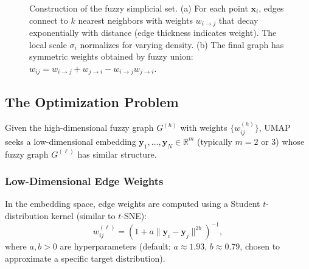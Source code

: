 \begin{figure}[h]
\caption{Construction of the fuzzy simplicial set. (a) For each point $\mathbf{x}_i$, edges connect to $k$ nearest neighbors with weights $w_{i \to j}$ that decay exponentially with distance (edge thickness indicates weight). The local scale $\sigma_i$ normalizes for varying density. (b) The final graph has symmetric weights obtained by fuzzy union: $w_{ij} = w_{i \to j} + w_{j \to i} - w_{i \to j} w_{j \to i}$.}
\label{fig:umap-graph}
\end{figure}

\subsection{The Optimization Problem}

Given the high-dimensional fuzzy graph $G^{(h)}$ with weights $\{w_{ij}^{(h)}\}$, UMAP seeks a low-dimensional embedding $\mathbf{y}_1, \dots, \mathbf{y}_N \in \mathbb{R}^m$ (typically $m = 2$ or $3$) whose fuzzy graph $G^{(\ell)}$ has similar structure.

\subsubsection{Low-Dimensional Edge Weights}

In the embedding space, edge weights are computed using a Student $t$-distribution kernel (similar to $t$-SNE):
\begin{equation}\label{eq:umap-low-weight}
  w_{ij}^{(\ell)} = \left(1 + a\|\mathbf{y}_i - \mathbf{y}_j\|^{2b}\right)^{-1},
\end{equation}
where $a, b > 0$ are hyperparameters (default: $a \approx 1.93$, $b \approx 0.79$, chosen to approximate a specific target distribution).

